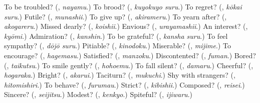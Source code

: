 \begin{tcolorbox}[breakable,colback=teal!4,colframe=teal!35!black,title={Before you move on}]
To be troubled? (\textbf{}, \emph{nayamu}.) To brood? (\textbf{}, \emph{kuyokuyo suru}.) To regret? (\textbf{}, \emph{kōkai suru}.) Futile? (\textbf{}, \emph{munashii}.) To give up? (\textbf{}, \emph{akirameru}.) To yearn after? (\textbf{}, \emph{akogareru}.) Missed dearly? (\textbf{}, \emph{koishii}.) Envious? (\textbf{}, \emph{urayamashii}.) An interest? (\textbf{}, \emph{kyōmi}.) Admiration? (\textbf{}, \emph{kanshin}.) To be grateful? (\textbf{}, \emph{kansha suru}.) To feel sympathy? (\textbf{}, \emph{dōjō suru}.) Pitiable? (\textbf{}, \emph{kinodoku}.) Miserable? (\textbf{}, \emph{mijime}.) To encourage? (\textbf{}, \emph{hagemasu}.) Satisfied? (\textbf{}, \emph{manzoku}.) Discontented? (\textbf{}, \emph{fuman}.) Bored? (\textbf{}, \emph{taikutsu}.) To smile gently? (\textbf{}, \emph{hohoemu}.) To fall silent? (\textbf{}, \emph{damaru}.) Cheerful? (\textbf{}, \emph{hogaraka}.) Bright? (\textbf{}, \emph{akarui}.) Taciturn? (\textbf{}, \emph{mukuchi}.) Shy with strangers? (\textbf{}, \emph{hitomishiri}.) To behave? (\textbf{}, \emph{furumau}.) Strict? (\textbf{}, \emph{kibishii}.) Composed? (\textbf{}, \emph{reisei}.) Sincere? (\textbf{}, \emph{seijitsu}.) Modest? (\textbf{}, \emph{kenkyo}.) Spiteful? (\textbf{}, \emph{ijiwaru}.)
\end{tcolorbox}
